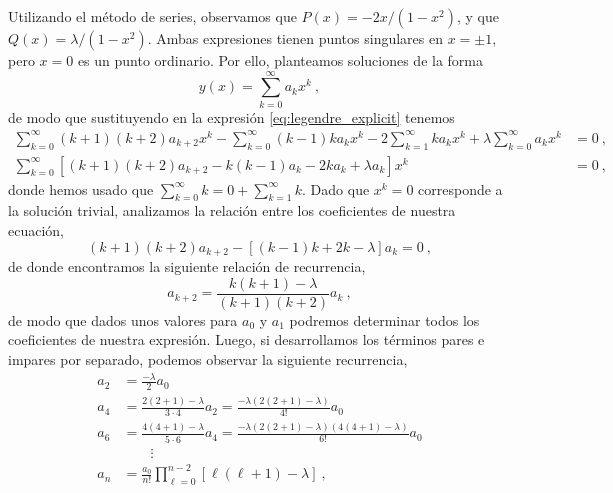 
Utilizando el método de series, observamos que $P(x) = -2x/(1-x^2)$, y que $Q(x) = \lambda/(1-x^2)$. Ambas expresiones tienen puntos singulares en $x = \pm 1$, pero $x=0$ es un punto ordinario. Por ello, planteamos soluciones de la forma
\begin{equation}
        y(x) = \sum_{k=0}^{\infty} a_k x^k \ ,
\end{equation}
de modo que sustituyendo en la expresión \eqref{eq:legendre_explicit} tenemos 
\begin{align*}
    \sum_{k=0}^{\infty} (k+1)(k+2) a_{k+2} x^k - \sum_{k=0}^{\infty} (k-1) k a_k x^k - 2 \sum_{k=1}^{\infty} k a_k x^k + \lambda \sum_{k=0}^{\infty} a_k x^k & = 0 \ , \\
    \sum_{k=0}^{\infty} \left[ (k+1)(k+2) a_{k+2} - k(k-1)a_k  - 2k a_k + \lambda a_k \right]x^k & = 0 \ ,
\end{align*}
donde hemos usado que $\sum_{k=0}^{\infty} k = 0 + \sum_{k=1}^{\infty} k$. Dado que $x^k = 0$ corresponde a la solución trivial, analizamos la relación entre los coeficientes de nuestra ecuación,
\begin{equation}
    (k+1)(k+2) a_{k+2} - [(k-1) k + 2k - \lambda]a_k = 0 \ ,
\end{equation}
de donde encontramos la siguiente relación de recurrencia,
\begin{equation}\label{eq:recurrencia_legendre}
    a_{k+2} = \frac{k(k+1) - \lambda}{(k+1)(k+2)}a_k \ ,
\end{equation}
de modo que dados unos valores para $a_0$ y $a_1$ podremos determinar todos los coeficientes de nuestra expresión. Luego, si desarrollamos los términos pares e impares por separado, podemos observar la siguiente recurrencia,
\begin{align*}
    a_2 & = \frac{-\lambda}{2} a_0 \\
    a_4 & = \frac{2(2+1) - \lambda}{3 \cdot 4} a_2 = \frac{-\lambda(2(2+1)-\lambda)}{4!}a_0 \\
    a_6 & = \frac{4(4+1) - \lambda}{5 \cdot 6} a_4 = \frac{-\lambda (2(2+1)-\lambda)(4(4+1)-\lambda)}{6!} a_0 \\
    & \qquad \vdots \\
    a_n & = \frac{a_0}{n!}\prod_{\ell=0}^{n-2}[\ell (\ell+1) - \lambda] \ ,
\end{align*}

